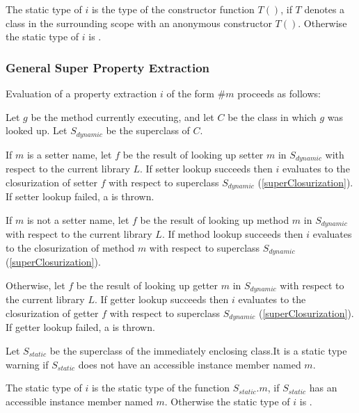 \documentclass{article}
\begin{document}

\LMHash{}
The static type of $i$ is the type of the constructor function $T()$, if $T$ denotes a class in the surrounding scope with an anonymous constructor $T()$. Otherwise the static type of $i$ is \DYNAMIC{}.

\subsubsection{General Super Property Extraction}


\LMHash{}
Evaluation of a property extraction $i$ of the form \SUPER$\#m$ proceeds as follows:

 \LMHash{}
Let $g$ be the method currently executing, and let $C$ be the class in which $g$ was looked up.  Let $S_{dynamic}$ be the superclass of $C$. 

 \LMHash{}
If $m$ is a setter name, let $f$ be the result of looking up setter $m$ in $S_{dynamic}$ with respect to the current library $L$. If setter lookup succeeds then $i$ evaluates to the closurization of setter $f$  with respect to superclass $S_{dynamic}$  (\ref{superClosurization}).  If setter lookup failed, a  is thrown.

If $m$ is not a setter name, let $f$ be the result of looking up method $m$ in $S_{dynamic}$ with respect to the current library $L$. If method lookup succeeds then $i$ evaluates to the closurization of method $m$ with respect to superclass $S_{dynamic}$ (\ref{superClosurization}).

\LMHash{}
 Otherwise, let $f$ be the result of looking up getter $m$ in $S_{dynamic}$ with respect to the current library $L$.  If getter lookup succeeds then $i$ evaluates to the closurization of getter $f$ with respect to superclass $S_{dynamic}$ (\ref{superClosurization}).   If getter lookup failed, a  is thrown.

\LMHash{}
Let $S_{static}$ be the superclass of the immediately enclosing class.It is a static type warning if $S_{static}$ does not have an accessible instance member named $m$.

\LMHash{}
The static type of $i$ is the static type of the function $S_{static}.m$,  if $S_{static}$ has an accessible instance member named $m$. Otherwise the static type of $i$ is \DYNAMIC{}.
\end{document}
